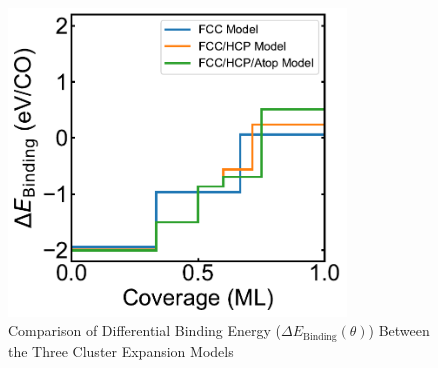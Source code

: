\documentclass[11pt]{article}
\begin{document}
\clearpage
\begin{figure} [ht]
\centering
\includegraphics[width=0.8\textwidth]{Figure/BE-com.pdf}
\caption{Comparison of Differential Binding Energy ($\Delta E_\mathrm{Binding}(\theta)$) Between the Three Cluster Expansion Models}
\label{DiffBindingEnergy}
\end{figure}
\end{document}
